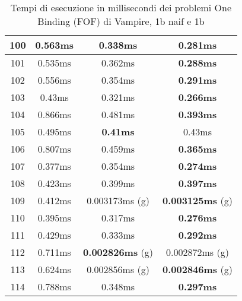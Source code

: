 \begin{table}[H]
\begin{minipage}{5cm}
{\begin{tabular}{|c|c|c|c|}
\hline
100 & 0.563ms & 0.338ms & \textbf{0.281ms} \\
\hline
101 & 0.535ms & 0.362ms & \textbf{0.288ms} \\
\hline
102 & 0.556ms & 0.354ms & \textbf{0.291ms} \\
\hline
103 & 0.43ms & 0.321ms & \textbf{0.266ms} \\
\hline
104 & 0.866ms & 0.481ms & \textbf{0.393ms} \\
\hline
105 & 0.495ms & \textbf{0.41ms} & 0.43ms \\
\hline
106 & 0.807ms & 0.459ms & \textbf{0.365ms} \\
\hline
107 & 0.377ms & 0.354ms & \textbf{0.274ms} \\
\hline
108 & 0.423ms & 0.399ms & \textbf{0.397ms} \\
\hline
109 & 0.412ms & 0.003173ms (g) & \textbf{0.003125ms} (g) \\
\hline
110 & 0.395ms & 0.317ms & \textbf{0.276ms} \\
\hline
111 & 0.429ms & 0.333ms & \textbf{0.292ms} \\
\hline
112 & 0.711ms & \textbf{0.002826ms} (g) & 0.002872ms (g) \\
\hline
113 & 0.624ms & 0.002856ms (g) & \textbf{0.002846ms} (g) \\
\hline
114 & 0.788ms & 0.348ms & \textbf{0.297ms} \\
\hline
\end{tabular}
}
\end{minipage}
\caption{Tempi di esecuzione in millisecondi dei problemi One Binding (FOF) di Vampire, 1b naif e 1b}
\label{tab:fof_1b_time}
\end{table}
